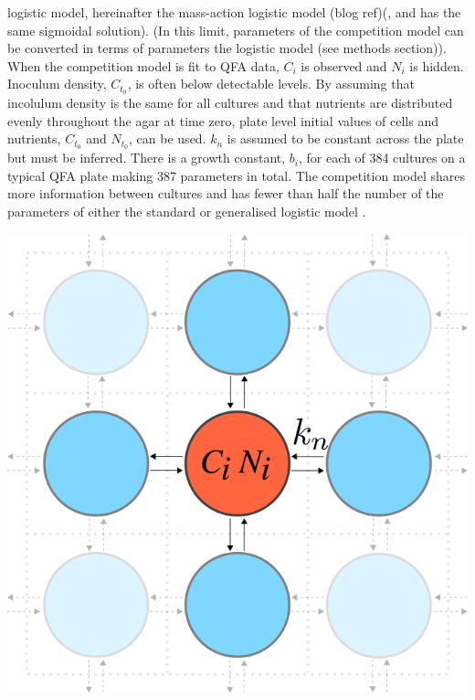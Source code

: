 logistic model, hereinafter the mass-action logistic model (blog
ref)(, and has the same sigmoidal solution). (In this limit,
parameters of the competition model can be converted in terms of
parameters the logistic model (see methods section)).
When the competition model is fit to QFA data, \(C_{i}\) is observed
and \(N_{i}\) is hidden. Inoculum density, \(C_{t_{0}}\), is often
below detectable levels. By assuming that incolulum density is the
same for all cultures and that nutrients are distributed evenly
throughout the agar at time zero, plate level initial values of cells
and nutrients, \(C_{t_{0}}\) and \(N_{t_{0}}\), can be used. \(k_{n}\)
is assumed to be constant across the plate but must be inferred. There
is a growth constant, \(b_{i}\), for each of 384 cultures on a typical
QFA plate making 387 parameters in total. The competition model shares
more information between cultures and has fewer than half the number
of the parameters of either the standard or generalised logistic model
\citep{Banks2012,qfa2016}.
\begin{Figure}
  \centering
  \includegraphics[width=\linewidth]{comp_model/comp_model_schematic}
  \label{fig:comp_model_schematic}
\end{Figure}

